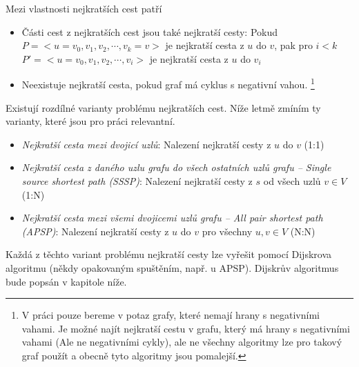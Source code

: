 \documentclass[thesis=M,czech]{FITthesis}[2019/12/23]
\theoremstyle{plain}
\theoremstyle{definition}
\begin{document}
Mezi vlastnosti nejkratších cest patří
            
\begin{itemize}
\item Části cest z nejkratších cest jsou také nejkratší cesty: Pokud $P =
  <u=v_0,v_1,v_2, \cdots, v_k=v>$ je nejkratší cesta z $u$ do $v$,
  pak pro $i<k$ $P'= <u=v_0,v_1,v_2, \cdots, v_i>$ je nejkratší cesta z $u$ do $v_i$
  
  
\item Neexistuje nejkratší cesta, pokud graf má cyklus s negativní vahou.  \footnote{V práci pouze bereme v potaz grafy, které nemají hrany s negativními vahami. Je možné najít nejkratší cestu v grafu, který má hrany s negativními vahami (Ale ne negativními cykly), ale ne všechny algoritmy lze pro takový graf použít a obecně tyto algoritmy jsou pomalejší.}
  

\end{itemize}



Existují rozdílné varianty problému nejkratších cest. Níže letmě zmíním ty varianty, které jsou pro práci relevantní.




  \begin{itemize}
  \item {\em Nejkratší cesta mezi dvojicí uzlů}: Nalezení nejkratší cesty z  $u$  do $v$ (1:1)
  \item {\em Nejkratší cesta z daného uzlu grafu do všech ostatních uzlů grafu -- Single source shortest path (SSSP)}: Nalezení nejkratší cesty z  $s$ od všech uzlů $v \in V$ (1:N)
  \item {\em Nejkratší cesta mezi všemi dvojicemi uzlů grafu -- All pair shortest path (APSP)}: Nalezení nejkratší cesty z $u$ do $v$  pro všechny $u,v \in V$ (N:N)
  \end{itemize}

Každá z těchto variant problému nejkratší cesty lze vyřešit pomocí Dijskrova algoritmu (někdy opakovaným spuštěním, např. u APSP). Dijskrův algoritmus bude popsán v kapitole níže. 







\end{document}
